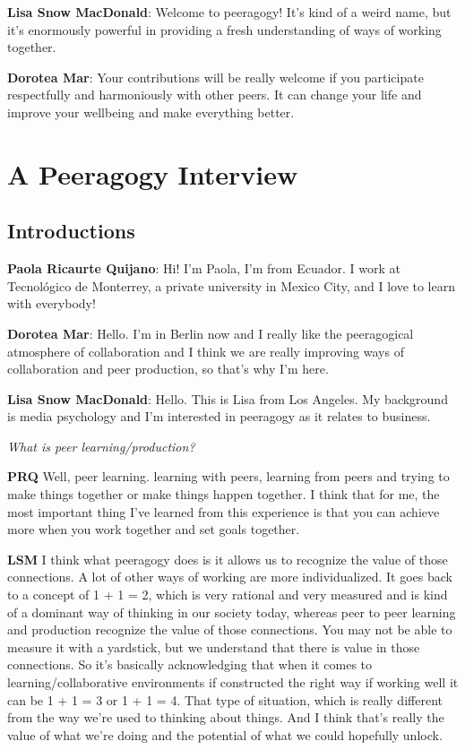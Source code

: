 \textbf{Lisa Snow MacDonald}: Welcome to peeragogy! It's kind of a weird
name, but it's enormously powerful in providing a fresh understanding of
ways of working together.

\textbf{Dorotea Mar}: Your contributions will be really welcome if you
participate respectfully and harmoniously with other peers. It can
change your life and improve your well­being and make everything better.

\hypertarget{a-peeragogy-interview}{%
\section{A Peeragogy Interview}\label{a-peeragogy-interview}}

\hypertarget{introductions}{%
\subsection{Introductions}\label{introductions}}

\textbf{Paola Ricaurte Quijano}: Hi! I'm Paola, I'm from Ecuador. I work
at Tecnológico de Monterrey, a private university in Mexico City, and I
love to learn with everybody!

\textbf{Dorotea Mar}: Hello. I'm in Berlin now and I really like the
peeragogical atmosphere of collaboration and I think we are really
improving ways of collaboration and peer production, so that's why I'm
here.

\textbf{Lisa Snow MacDonald}: Hello. This is Lisa from Los Angeles. My
background is media psychology and I'm interested in peeragogy as it
relates to business.

\emph{What is peer learning/production?}

\textbf{PRQ} Well, peer learning. learning with peers, learning from
peers and trying to make things together or make things happen together.
I think that for me, the most important thing I've learned from this
experience is that you can achieve more when you work together and set
goals together.

\textbf{LSM} I think what peeragogy does is it allows us to recognize
the value of those connections. A lot of other ways of working are more
individualized. It goes back to a concept of 1 + 1 = 2, which is very
rational and very measured and is kind of a dominant way of thinking in
our society today, whereas peer to peer learning and production
recognize the value of those connections. You may not be able to measure
it with a yardstick, but we understand that there is value in those
connections. So it's basically acknowledging that when it comes to
learning/collaborative environments if constructed the right way if
working well it can be 1 + 1 = 3 or 1 + 1 = 4. That type of situation,
which is really different from the way we're used to thinking about
things. And I think that's really the value of what we're doing and the
potential of what we could hopefully unlock.

